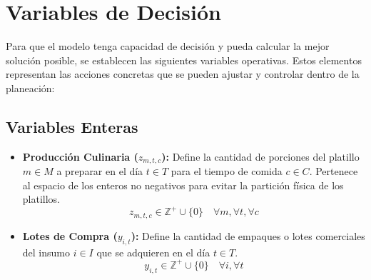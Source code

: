 \documentclass[12pt]{report}
\begin{document}
\section{Variables de Decisión}

Para que el modelo tenga capacidad de decisión y pueda calcular la mejor solución posible, se establecen las siguientes variables operativas. Estos elementos representan las acciones concretas que se pueden ajustar y controlar dentro de la planeación:

\subsection{Variables Enteras}
\begin{itemize}
    \item \textbf{Producción Culinaria ($z_{m,t,c}$):} Define la cantidad de porciones del platillo $m \in M$ a preparar en el día $t \in T$ para el tiempo de comida $c \in C$. Pertenece al espacio de los enteros no negativos para evitar la partición física de los platillos.
    \begin{equation}
        z_{m,t,c} \in \mathbb{Z}^{+} \cup \{0\} \quad \forall m, \forall t, \forall c
    \end{equation}

    \item \textbf{Lotes de Compra ($y_{i,t}$):} Define la cantidad de empaques o lotes comerciales del insumo $i \in I$ que se adquieren en el día $t \in T$.
    \begin{equation}
        y_{i,t} \in \mathbb{Z}^{+} \cup \{0\} \quad \forall i, \forall t
    \end{equation}
\end{itemize}
\end{document}
